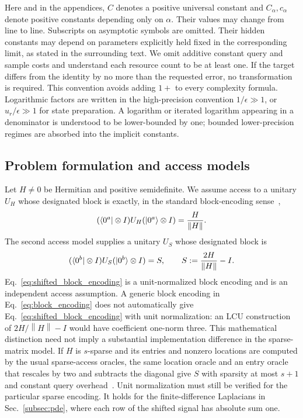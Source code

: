 \documentclass[aps,pra,reprint,floatfix,unsortedaddress,superscriptaddress]{revtex4-2}
\newcommand{\norm}[1]{\left\lVert#1\right\rVert}
\begin{document}
Here and in the appendices, $C$ denotes a positive
universal constant and $C_\alpha,c_\alpha$ denote positive constants
depending only on $\alpha$.  Their values may change from line to line.
Subscripts on asymptotic symbols are omitted.  Their hidden
constants may depend on parameters explicitly held fixed in the
corresponding limit, as stated in the surrounding text.
We omit additive constant query and sample costs and understand each
resource count to be at least one.  If the target
differs from the identity by no more than the requested error, no
transformation is required.  This convention avoids adding $1+$ to
every complexity formula.
Logarithmic factors are written in the high-precision convention
$1/\epsilon\gg1$, or $u_r/\epsilon\gg1$ for state preparation.  A
logarithm or iterated logarithm appearing in a denominator is
understood to be lower-bounded by one; bounded lower-precision regimes
are absorbed into the implicit constants.

\subsection{Problem formulation and access models}
\label{subsec:problem}

Let $H\ne0$ be Hermitian and positive semidefinite.  We assume access
to a unitary $U_H$ whose designated block is exactly, in the standard
block-encoding sense~\cite{Gilyen2019qsvt},
\begin{equation}
    (\bra{0^a}\otimes I)U_H(\ket{0^a}\otimes I)
    =
    \frac{H}{\norm{H}}.
    \label{eq:block_encoding}
\end{equation}
The second access model supplies a unitary $U_S$ whose designated
block is
\begin{equation}
    (\bra{0^b}\otimes I)U_S(\ket{0^b}\otimes I)
    =
    S,
    \qquad
    S:=\frac{2H}{\norm{H}}-I.
    \label{eq:shifted_block_encoding}
\end{equation}
Eq.~\eqref{eq:shifted_block_encoding} is a unit-normalized block
encoding and is an independent access assumption.  A generic block
encoding in Eq.~\eqref{eq:block_encoding} does not automatically give
Eq.~\eqref{eq:shifted_block_encoding} with unit normalization: an
LCU construction of $2H/\norm{H}-I$ would have coefficient one-norm
three.  This mathematical distinction need not imply a substantial
implementation difference in the sparse-matrix model.  If $H$ is
$s$-sparse and its entries and nonzero locations are computed by the
usual sparse-access oracles, the same location oracle and an entry
oracle that rescales by two and subtracts the diagonal give $S$ with
sparsity at most $s+1$ and constant query
overhead~\cite{Berry2007,Gilyen2019qsvt}.  Unit
normalization must still be verified for the particular sparse
encoding.  It holds for the finite-difference Laplacians in
Sec.~\ref{subsec:pde}, where each row of the shifted signal has
absolute sum one.
\end{document}
